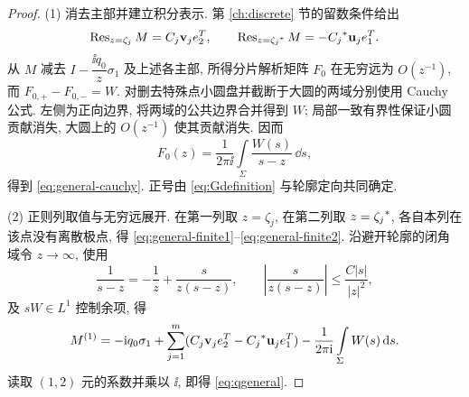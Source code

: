 \begin{proof}
(1) 消去主部并建立积分表示. 第 \ref{ch:discrete} 节的留数条件给出
\begin{equation*}
\operatorname{Res}_{z=\zeta_j}M=C_j\mathbf v_je_2^T,\qquad
\operatorname{Res}_{z={\zeta_j}^{*}}M=-{C_j}^{*}\mathbf u_je_1^T.
\end{equation*}
从 $M$ 减去 $I-\dfrac{\ii q_0}{z}\sigma_1$ 及上述各主部, 所得分片解析矩阵 $F_0$ 在无穷远为 $O(z^{-1})$, 而 $F_{0,+}-F_{0,-}=W$. 对删去特殊点小圆盘并截断于大圆的两域分别使用 Cauchy 公式. 左侧为正向边界, 将两域的公共边界合并得到 $W$; 局部一致有界性保证小圆贡献消失, 大圆上的 $O(z^{-1})$ 使其贡献消失. 因而
\begin{equation*}
F_0(z)=\dfrac{1}{2\pi\ii}\int\limits_\Sigma\dfrac{W(s)}{s-z}\,\dd s,
\end{equation*}
得到 \eqref{eq:general-cauchy}. 正号由 \eqref{eq:Gdefinition} 与轮廓定向共同确定.

(2) 正则列取值与无穷远展开. 在第一列取 $z=\zeta_j$, 在第二列取 $z={\zeta_j}^{*}$, 各自本列在该点没有离散极点, 得 \eqref{eq:general-finite1}--\eqref{eq:general-finite2}. 沿避开轮廓的闭角域令 $z\to\infty$, 使用
\begin{equation*}
\dfrac{1}{s-z}=-\dfrac{1}{z}+\dfrac{s}{z(s-z)},\qquad
\left|\dfrac{s}{z(s-z)}\right|\le\dfrac{C|s|}{|z|^2},
\end{equation*}
及 $sW\in L^1$ 控制余项, 得
\begin{equation}\label{eq:M1-general}
M^{(1)}=-\mathrm{i} q_0\sigma_1
+\sum\limits_{j=1}^{m}(C_j\mathbf v_je_2^T-{C_j}^{*}\mathbf u_je_1^T)
-\dfrac{1}{2\pi\mathrm{i}}\int\limits_\Sigma W(s)\,\mathrm{d} s.
\end{equation}
读取 $(1,2)$ 元的系数并乘以 $\ii$, 即得 \eqref{eq:qgeneral}.
\end{proof}

